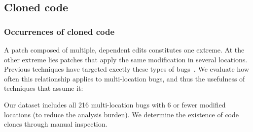 \documentclass[10pt, conference]{IEEEtran}
\begin{document}
\subsection{Cloned code}
\label{sec:clones}

\subsubsection{Occurrences of cloned code}

A patch composed of multiple, dependent edits constitutes one
extreme. At the other extreme lies patches that apply the same modification in several locations. 
Previous techniques have targeted exectly these types of
bugs~\cite{wang2018,saha2019harnessing}.  We evaluate how often this relationship applies to
multi-location bugs, and thus the usefulness of techniques that assume it:



Our dataset includes all 216 multi-location bugs with 6 or fewer modified
locations (to reduce the analysis burden). We determine the existence of code 
clones through manual inspection.
%
%
\end{document}
